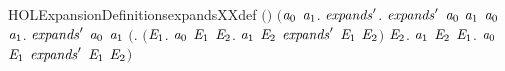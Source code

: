 \newcommand{\HOLExpansionDate}{12 Dicembre 2019}
\newcommand{\HOLExpansionTime}{11:58}
\begin{SaveVerbatim}{HOLExpansionDefinitionsexpandsXXdef}
\HOLTokenTurnstile{} \ensuremath{(}\ensuremath{)} \HOLSymConst{\ensuremath{=}}
   \ensuremath{(}\HOLTokenLambda{}\ensuremath{\HOLBoundVar{a}\sb{\mathrm{0}}} \ensuremath{\HOLBoundVar{a}\sb{\mathrm{1}}}.
        \HOLSymConst{\HOLTokenExists{}}\ensuremath{\HOLBoundVar{expands}\sp{\prime}}.
            \ensuremath{\HOLBoundVar{expands}\sp{\prime}} \ensuremath{\HOLBoundVar{a}\sb{\mathrm{0}}} \ensuremath{\HOLBoundVar{a}\sb{\mathrm{1}}} \HOLSymConst{\HOLTokenConj{}}
            \HOLSymConst{\HOLTokenForall{}}\ensuremath{\HOLBoundVar{a}\sb{\mathrm{0}}} \ensuremath{\HOLBoundVar{a}\sb{\mathrm{1}}}.
                \ensuremath{\HOLBoundVar{expands}\sp{\prime}} \ensuremath{\HOLBoundVar{a}\sb{\mathrm{0}}} \ensuremath{\HOLBoundVar{a}\sb{\mathrm{1}}} \HOLSymConst{\HOLTokenImp{}}
                \ensuremath{(}\HOLSymConst{\HOLTokenForall{}}.
                     \ensuremath{(}\HOLSymConst{\HOLTokenForall{}}\ensuremath{\HOLBoundVar{E}\sb{\mathrm{1}}}.
                          \ensuremath{\HOLBoundVar{a}\sb{\mathrm{0}}} \HOLTokenTransBegin{} \HOLTokenTransEnd \ensuremath{\HOLBoundVar{E}\sb{\mathrm{1}}} \HOLSymConst{\HOLTokenImp{}}
                          \HOLSymConst{\HOLTokenExists{}}\ensuremath{\HOLBoundVar{E}\sb{\mathrm{2}}}. \ensuremath{\HOLBoundVar{a}\sb{\mathrm{1}}} \HOLTokenTransBegin{} \HOLTokenTransEnd \ensuremath{\HOLBoundVar{E}\sb{\mathrm{2}}} \HOLSymConst{\HOLTokenConj{}} \ensuremath{\HOLBoundVar{expands}\sp{\prime}} \ensuremath{\HOLBoundVar{E}\sb{\mathrm{1}}} \ensuremath{\HOLBoundVar{E}\sb{\mathrm{2}}}\ensuremath{)} \HOLSymConst{\HOLTokenConj{}}
                     \HOLSymConst{\HOLTokenForall{}}\ensuremath{\HOLBoundVar{E}\sb{\mathrm{2}}}.
                         \ensuremath{\HOLBoundVar{a}\sb{\mathrm{1}}} \HOLTokenTransBegin{} \HOLTokenTransEnd \ensuremath{\HOLBoundVar{E}\sb{\mathrm{2}}} \HOLSymConst{\HOLTokenImp{}}
                         \HOLSymConst{\HOLTokenExists{}}\ensuremath{\HOLBoundVar{E}\sb{\mathrm{1}}}. \ensuremath{\HOLBoundVar{a}\sb{\mathrm{0}}} \HOLTokenWeakTransBegin{} \HOLTokenWeakTransEnd \ensuremath{\HOLBoundVar{E}\sb{\mathrm{1}}} \HOLSymConst{\HOLTokenConj{}} \ensuremath{\HOLBoundVar{expands}\sp{\prime}} \ensuremath{\HOLBoundVar{E}\sb{\mathrm{1}}} \ensuremath{\HOLBoundVar{E}\sb{\mathrm{2}}}\ensuremath{)} \HOLSymConst{\HOLTokenConj{}}

\end{SaveVerbatim}
